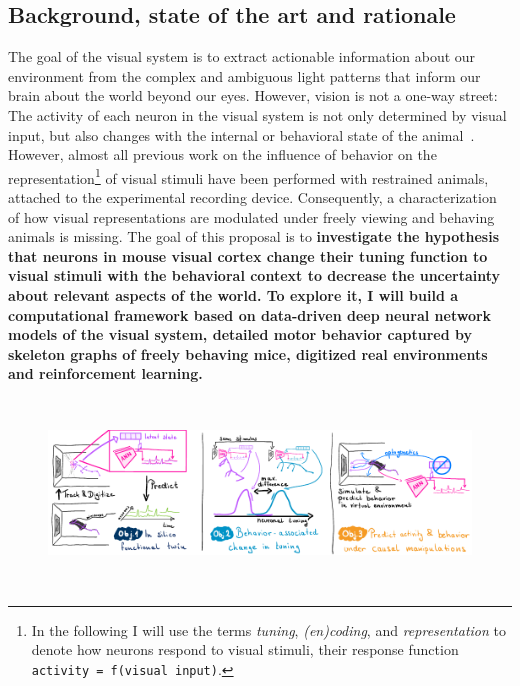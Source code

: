 \documentclass[COG,11pt]{ercgrant}
\begin{document}
\subsection{Background, state of the art and rationale}
The goal of the visual system is to extract actionable information about our environment from the complex and ambiguous light patterns that inform our brain about the world beyond our eyes.
However, vision is not a one-way street: The activity of each neuron in the visual system is not only determined by visual input, but also changes with the internal or behavioral state of the animal~\parencite{Niell2010-bs, Musall2019-kd, Erisken2014-un, Franke2022-do}. 
However, almost all previous work on the influence of behavior on the representation\footnote{In the following I will use the terms \textit{tuning}, \textit{(en)coding}, and \textit{representation} to denote how neurons respond to visual stimuli, \ie their response function \texttt{activity = f(visual input)}.} of visual stimuli have been performed with restrained animals, attached to the experimental recording device.
Consequently, a characterization of how visual representations are modulated under freely viewing and behaving animals is missing. 
The goal of this proposal is to \textbf{investigate the hypothesis that neurons in mouse visual cortex change their tuning function to visual stimuli with the behavioral context to decrease the uncertainty about relevant aspects of the world. To explore it, I will build a computational framework based on data-driven deep neural network models of the visual system, detailed motor behavior captured by skeleton graphs of freely behaving mice, digitized real environments and reinforcement learning.} 

\begin{figure}[t]
\includegraphics[width=\textwidth, height=5cm]{figures/overview5.pdf}
\end{figure}
\end{document}
